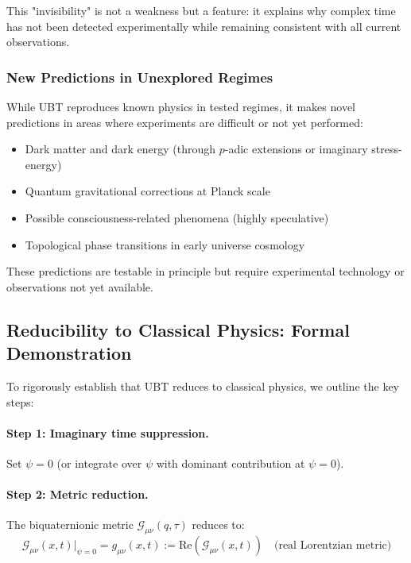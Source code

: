 This "invisibility" is not a weakness but a feature: it explains why complex time has not been detected experimentally while remaining consistent with all current observations.

\subsubsection{New Predictions in Unexplored Regimes}

While UBT reproduces known physics in tested regimes, it makes novel predictions in areas where experiments are difficult or not yet performed:
\begin{itemize}
\item Dark matter and dark energy (through $p$-adic extensions or imaginary stress-energy)
\item Quantum gravitational corrections at Planck scale
\item Possible consciousness-related phenomena (highly speculative)
\item Topological phase transitions in early universe cosmology
\end{itemize}

These predictions are testable in principle but require experimental technology or observations not yet available.

\subsection{Reducibility to Classical Physics: Formal Demonstration}

To rigorously establish that UBT reduces to classical physics, we outline the key steps:

\paragraph{Step 1: Imaginary time suppression.} Set $\psi = 0$ (or integrate over $\psi$ with dominant contribution at $\psi = 0$).

\paragraph{Step 2: Metric reduction.} The biquaternionic metric $\mathcal{G}_{\mu\nu}(q,\tau)$ reduces to:
\begin{equation}
\mathcal{G}_{\mu\nu}(x,t) \big|_{\psi=0} = g_{\mu\nu}(x,t) := \text{Re}(\mathcal{G}_{\mu\nu}(x,t)) \quad \text{(real Lorentzian metric)}
\end{equation}

